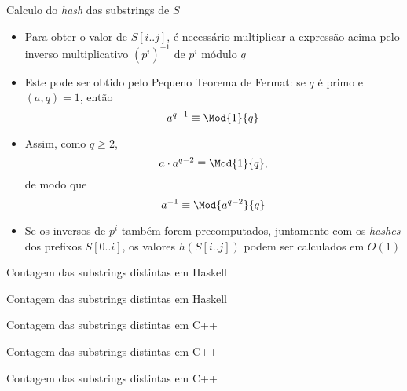 \begin{frame}[fragile]{Calculo do {\it hash} das substrings de $S$}

    \begin{itemize}
        \item Para obter o valor de $S[i..j]$, é necessário multiplicar a expressão acima
            pelo inverso multiplicativo $(p^i)^{-1}$ de $p^i$ módulo $q$
        \pause


        \item Este pode ser obtido pelo Pequeno Teorema de Fermat: se $q$ é primo e 
        $(a, q) = 1$, então
        \[
            a^{q-1}\equiv \Mod{1}{q}
        \]
        \pause


        \item Assim, como $q \geq 2$,
        \[
            a\cdot a^{q-2}\equiv \Mod{1}{q},
        \]
        de modo que 
        \[
            a^{-1}\equiv \Mod{a^{q-2}}{q}
        \]
        \pause


        \item Se os inversos de $p^i$ também forem precomputados, juntamente com os 
        \textit{hashes} dos prefixos $S[0..i]$, os valores $h(S[i..j])$ podem ser calculados
        em $O(1)$
    \end{itemize}

\end{frame}

\begin{frame}[fragile]{Contagem das substrings distintas em Haskell}
\end{frame}

\begin{frame}[fragile]{Contagem das substrings distintas em Haskell}
\end{frame}

\begin{frame}[fragile]{Contagem das substrings distintas em C++}
\end{frame}

\begin{frame}[fragile]{Contagem das substrings distintas em C++}
\end{frame}

\begin{frame}[fragile]{Contagem das substrings distintas em C++}
\end{frame}


